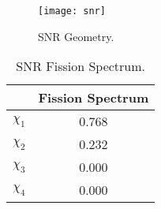     \begin{figure}
      \centering
      \texttt{[image: snr]}
      \caption{SNR Geometry.}
      \label{fig:snr_geom}
    \end{figure}

    \begin{table}
      \caption{SNR Fission Spectrum.}
      \label{tab:snrchi}
      \begin{center}
        \begin{tabular}{cc}
          \toprule
          &Fission Spectrum \\
          \midrule
          $\chi_1$ &0.768 \\
          $\chi_2$ &0.232 \\
          $\chi_3$ &0.000 \\
          $\chi_4$ &0.000 \\
          \bottomrule
        \end{tabular}
      \end{center}
    \end{table}

